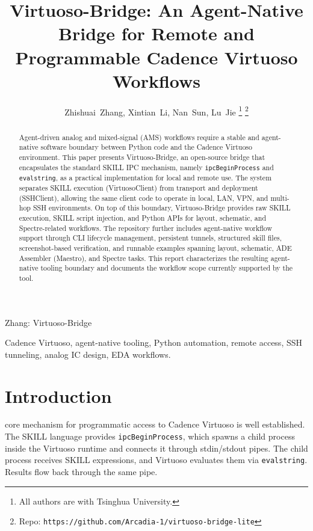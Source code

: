 \documentclass[lettersize,journal]{ieee_template/IEEEtran}
\begin{document}
\title{Virtuoso-Bridge: An Agent-Native Bridge for Remote and Programmable Cadence Virtuoso Workflows}

\author{Zhishuai~Zhang, Xintian~Li, Nan~Sun, Lu~Jie%
\thanks{All authors are with Tsinghua University.}%
\thanks{Repo: \texttt{https://github.com/Arcadia-1/virtuoso-bridge-lite}}%
}

\markboth{}%
{Zhang: Virtuoso-Bridge}

\maketitle

\begin{abstract}
Agent-driven analog and mixed-signal (AMS) workflows require a stable and agent-native software boundary between Python code and the Cadence Virtuoso environment. This paper presents Virtuoso-Bridge, an open-source bridge that encapsulates the standard SKILL IPC mechanism, namely \texttt{ipcBeginProcess} and \texttt{evalstring}, as a practical implementation for local and remote use. The system separates SKILL execution (VirtuosoClient) from transport and deployment (SSHClient), allowing the same client code to operate in local, LAN, VPN, and multi-hop SSH environments. On top of this boundary, Virtuoso-Bridge provides raw SKILL execution, SKILL script injection, and Python APIs for layout, schematic, and Spectre-related workflows. The repository further includes agent-native workflow support through CLI lifecycle management, persistent tunnels, structured skill files, screenshot-based verification, and runnable examples spanning layout, schematic, ADE Assembler (Maestro), and Spectre tasks. This report characterizes the resulting agent-native tooling boundary and documents the workflow scope currently supported by the tool.
\end{abstract}

\begin{IEEEkeywords}
Cadence Virtuoso, agent-native tooling, Python automation, remote access, SSH tunneling, analog IC design, EDA workflows.
\end{IEEEkeywords}

\section{Introduction}
 core mechanism for programmatic access to Cadence Virtuoso is well established. The SKILL language provides \texttt{ipcBeginProcess}, which spawns a child process inside the Virtuoso runtime and connects it through stdin/stdout pipes. The child process receives SKILL expressions, and Virtuoso evaluates them via \texttt{evalstring}. Results flow back through the same pipe.
\end{document}
